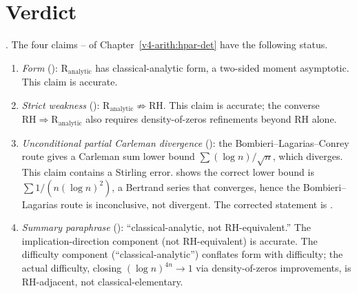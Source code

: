 \section{Verdict}
\label{v4-arith:r-audit:verdict}

\begin{theorem}
\label{v4-arith:r-audit:thm:verdict}
\ClaimStatusProvedHere. The four claims
--
of Chapter~\ref{v4-arith:hpar-det} have the following status.
\begin{enumerate}
\item[\textbf{(1)}] \emph{Form}
(): \(\mathrm{R}_{\mathrm{analytic}}\)
has classical-analytic form, a two-sided moment asymptotic. This
claim is accurate.
\item[\textbf{(2)}] \emph{Strict weakness}
():
\(\mathrm{R}_{\mathrm{analytic}}\not\Rightarrow\mathrm{RH}\). This
claim is accurate; the converse
\(\mathrm{RH}\Rightarrow\mathrm{R}_{\mathrm{analytic}}\) also
requires density-of-zeros refinements beyond RH alone.
\item[\textbf{(3)}] \emph{Unconditional partial Carleman divergence}
(): the Bombieri--Lagarias--Conrey
route gives a Carleman sum lower bound
\(\sum(\log n)/\sqrt{n}\), which diverges. This claim contains a
Stirling error.
 shows the
correct lower bound is \(\sum 1/(n(\log n)^{2})\), a Bertrand series
that converges, hence the Bombieri--Lagarias route is inconclusive,
not divergent. The corrected statement is
.
\item[\textbf{(4)}] \emph{Summary paraphrase}
(): ``classical-analytic,
not RH-equivalent.'' The implication-direction component (not
RH-equivalent) is accurate. The difficulty component
(``classical-analytic'') conflates form with difficulty; the actual
difficulty, closing \((\log n)^{4n}\to 1\) via density-of-zeros
improvements, is RH-adjacent, not classical-elementary.
\end{enumerate}
\end{theorem}

